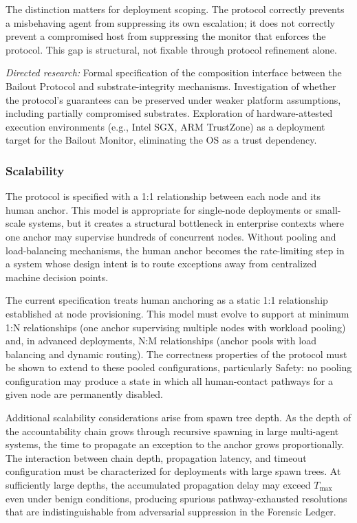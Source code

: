 The distinction matters for deployment scoping.  The protocol correctly prevents a misbehaving agent from suppressing its own escalation; it does not correctly prevent a compromised host from suppressing the monitor that enforces the protocol.  This gap is structural, not fixable through protocol refinement alone.

\textit{Directed research:} Formal specification of the composition interface between the Bailout Protocol and substrate-integrity mechanisms.  Investigation of whether the protocol's guarantees can be preserved under weaker platform assumptions, including partially compromised substrates.  Exploration of hardware-attested execution environments (e.g., Intel SGX, ARM TrustZone) as a deployment target for the Bailout Monitor, eliminating the OS as a trust dependency.

\subsubsection{Scalability}
\label{sec:scalability}

The protocol is specified with a 1:1 relationship between each node and its human anchor.  This model is appropriate for single-node deployments or small-scale systems, but it creates a structural bottleneck in enterprise contexts where one anchor may supervise hundreds of concurrent nodes.  Without pooling and load-balancing mechanisms, the human anchor becomes the rate-limiting step in a system whose design intent is to route exceptions away from centralized machine decision points.

The current specification treats human anchoring as a static 1:1 relationship established at node provisioning.  This model must evolve to support at minimum 1:N relationships (one anchor supervising multiple nodes with workload pooling) and, in advanced deployments, N:M relationships (anchor pools with load balancing and dynamic routing).  The correctness properties of the protocol must be shown to extend to these pooled configurations, particularly Safety: no pooling configuration may produce a state in which all human-contact pathways for a given node are permanently disabled.

Additional scalability considerations arise from spawn tree depth.  As the depth of the accountability chain grows through recursive spawning in large multi-agent systems, the time to propagate an exception to the anchor grows proportionally.  The interaction between chain depth, propagation latency, and timeout configuration must be characterized for deployments with large spawn trees.  At sufficiently large depths, the accumulated propagation delay may exceed $T_{\max}$ even under benign conditions, producing spurious pathway-exhausted resolutions that are indistinguishable from adversarial suppression in the Forensic Ledger.

